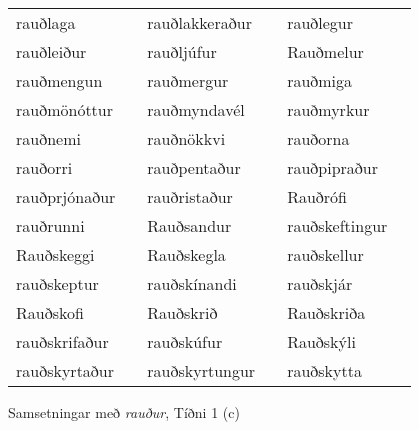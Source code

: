 \documentclass[../samsetningasafn.tex]{subfiles}
\begin{document}
\begin{wordlist}[H]
\begin{tcolorbox}
\begin{tabular}{BlBlBl}
		rauðlaga				&		& 
		rauðlakkeraður		&		& 
		rauðlegur			&		\\  %
		rauðleiður			&		& 
		rauðljúfur			&		& 
		Rauðmelur			&		\\  %
		rauðmengun			&		& 
		rauðmergur			&		& 
		rauðmiga			&		\\  %
		rauðmönóttur		&		& 
		rauðmyndavél		&		& 
		rauðmyrkur			&		\\  %
		rauðnemi			&		& 
		rauðnökkvi			&		& 
		rauðorna			&		\\  %
		rauðorri				&		& 
		rauðpentaður			&		& 
		rauðpipraður			&		\\  %
		rauðprjónaður		&		& 
		rauðristaður			&		& 
		Rauðrófi				&		\\  %
		rauðrunni			&		& 
		Rauðsandur			&		& 
		rauðskeftingur		&		\\  %
		Rauðskeggi			&		& 
		Rauðskegla			&		& 
		rauðskellur			&		\\  %
		rauðskeptur			&		& 
		rauðskínandi			&		& 
		rauðskjár			&		\\  %
		Rauðskofi			&		& 
		Rauðskrið			&		& 
		Rauðskriða			&		\\  %
		rauðskrifaður			&		& 
		rauðskúfur			&		& 
		Rauðskýli			&		\\  %
		rauðskyrtaður		&		& 
		rauðskyrtungur		&		& 
		rauðskytta			&		  %
	\end{tabular}

\end{tcolorbox}
	\caption{Samsetningar með \textit{rauður}, Tíðni 1 (c)}
	\label{listi:rautt.1c}
\end{wordlist}		
		
\end{document}
